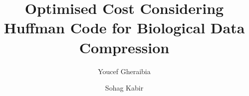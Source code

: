 \documentclass[preprint,12pt]{elsarticle}
\begin{document}
\begin{frontmatter}



\title{Optimised Cost Considering Huffman Code for Biological Data Compression}


\author[a,b]{Youcef Gheraibia}
\author[b]{Sohag Kabir}

\address{}

\address[a]{Department of Mathematics and Computer Science, University of Souk Ahras, Souk Ahras 41000, Algeria}

\address[b]{Department of Computer Science, University of Hull, Hull HU6 7RX, UK}






\end{frontmatter}
\end{document}
